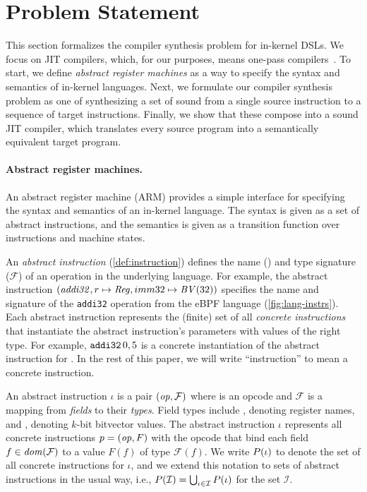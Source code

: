 \section{Problem Statement}\label{s:problem}

This section formalizes the compiler synthesis problem for in-kernel DSLs. We
focus on JIT compilers, which, for our purposes, means one-pass
compilers~\cite{engler:vcode}. To start, we define \emph{abstract register
machines} as a way to specify the syntax and semantics of in-kernel languages.
Next, we formulate our compiler synthesis problem as one of synthesizing a set
of sound \emph{\minicompilers} from a single source instruction to a sequence of
target instructions. Finally, we show that these \minicompilers compose into a
sound JIT compiler, which translates every source program into a semantically
equivalent target program.\tighten 


\paragraph{Abstract register machines.}

An abstract register machine (ARM) provides a simple interface for specifying
the syntax and semantics of an in-kernel language. The syntax is given as a set
of {abstract instructions}, and the semantics is given as a {transition
function} over instructions and machine {states}. 

An \emph{abstract instruction} (\autoref{def:instruction}) defines the name
() and type signature ($\mathcal{F}$) of an operation in the
underlying language. For example, the abstract instruction $(\mathit{addi32}, r
\mapsto \mathit{Reg}, imm32 \mapsto \mathit{BV}(32))$ specifies the name and signature of the
\texttt{addi32} operation from the eBPF language
(\autoref{fig:lang-instrs}). Each abstract instruction represents the (finite)
set of all \emph{concrete instructions} that instantiate the abstract
instruction's parameters with values of the right type. For example,
$\texttt{addi32}\, 0, 5$ is a concrete instantiation of the abstract instruction for
. In the rest of this paper, we will write ``instruction'' to mean a
concrete instruction.\tighten

\begin{definition}\label{def:instruction}
  An \textup{abstract instruction} $\iota$ is a pair $(\mathit{op}, \mathcal{F})$ where
   is an opcode and $\mathcal{F}$ is a mapping from \emph{fields}
  to their \emph{types}. Field types include \Reg, denoting register names, and
  , denoting $k$-bit bitvector values. The abstract instruction $\iota$
  represents all \textup{concrete instructions} $p = (\mathit{op}, F)$ with the
  opcode  that bind each field $f\in \mathit{dom}(\mathcal{F})$ to a
  value $F(f)$ of type $\mathcal{F}(f)$. We write $P(\iota)$ to denote the
  set of all concrete instructions for $\iota$, and we extend this notation to
  sets of abstract instructions in the usual way, i.e.,
  $P(\mathcal{I})=\bigcup_{\iota\in\mathcal{I}}P(\iota)$ for the set
  $\mathcal{I}$.\tighten
\end{definition}

